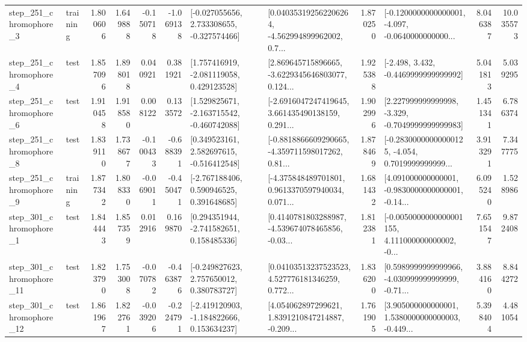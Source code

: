 \begin{tabular}{llrrrrllrlrr}
   step\_251\_chromophore\_3 &  training &      1.800606 &    1.649888 &     -0.150718 & -1.069138 &   [-0.027055656, 2.733308655, -0.327574466] &  [0.040353192562206264, -4.562994899962002, 0.7... &       1.870250 &  [-0.1200000000000001, -4.097, -0.0640000000000... &            8.046387 &         10.035573 \\
   step\_251\_chromophore\_4 &      test &      1.857096 &    1.898018 &      0.040921 &  0.381921 &    [1.757416919, -2.081119058, 0.429123528] &  [2.869645715896665, -3.6229345646803077, 0.124... &       1.925388 &               [-2.498, 3.432, -0.4469999999999992] &            5.041813 &          5.039295 \\
   step\_251\_chromophore\_6 &      test &      1.910458 &    1.918580 &      0.008122 &  0.133572 &   [1.529825671, -2.163715542, -0.460742088] &  [-2.6916047247419645, 3.661435490138159, 0.291... &       1.902996 &   [2.227999999999998, -3.329, -0.7049999999999983] &            1.451341 &          6.786374 \\
   step\_251\_chromophore\_8 &      test &      1.839110 &    1.738677 &     -0.100433 & -0.688391 &    [0.349523161, 2.582697615, -0.516412548] &  [-0.8818866609290665, -4.359711598017262, 0.81... &       1.878469 &  [-0.28300000000000125, -4.054, 0.7019999999999... &            3.913291 &          7.347775 \\
   step\_251\_chromophore\_9 &  training &      1.877342 &    1.808330 &     -0.069011 & -0.450471 &    [-2.767188406, 0.590946525, 0.391648685] &  [-4.375848489701801, 0.9613370597940034, 0.071... &       1.681432 &  [4.091000000000001, -0.9830000000000001, -0.14... &            6.095240 &          1.528986 \\
   step\_301\_chromophore\_1 &      test &      1.844443 &    1.857359 &      0.012916 &  0.169870 &    [0.294351944, -2.741582651, 0.158485336] &  [0.4140781803288987, -4.539674078465856, -0.03... &       1.812381 &  [-0.0050000000000001155, 4.111000000000002, -0... &            7.651547 &          9.872408 \\
  step\_301\_chromophore\_11 &      test &      1.823790 &    1.753008 &     -0.070782 & -0.463876 &    [-0.249827623, 2.757650012, 0.380783727] &  [0.04103513237523523, 4.527776181346259, 0.772... &       1.836200 &  [0.5989999999999966, -4.030999999999999, -0.71... &            3.884160 &          8.844272 \\
  step\_301\_chromophore\_12 &      test &      1.861967 &    1.822761 &     -0.039206 & -0.224791 &   [-2.419120903, -1.184822666, 0.153634237] &  [4.054062897299621, 1.8391210847214887, -0.209... &       1.761905 &  [3.905000000000001, 1.5380000000000003, -0.449... &            5.398404 &          4.481054 \\

\end{tabular}
